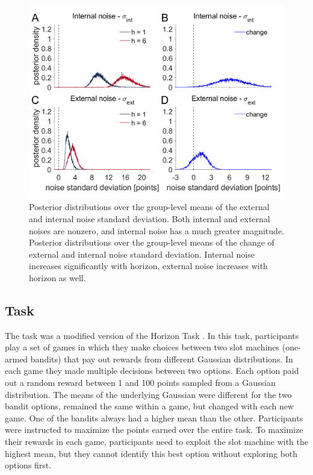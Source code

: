 \documentclass[12pt]{article}
\begin{document}
	\begin{figure}[H]
		\begin{center}
			\includegraphics[width=1\textwidth]{figall/hyperprior.png}
			\caption[Posterior distributions over the group-level noise standard deviation of the external and internal noise variance.]{Posterior distributions over the group-level means of the external and internal noise standard deviation. Both internal and external noises are nonzero, and internal noise has a much greater magnitude. Posterior distributions over the group-level means of the change of external and internal noise standard deviation. Internal noise increases significantly with horizon, external noise increases with horizon as well.}
			\label{fig:mb12}
		\end{center}
	\end{figure}
	
	\subsection*{Task}
	The task was a modified version of the Horizon Task \citep{wilson2014}. In this task, participants play a set of games in which they make choices between two slot machines (one-armed bandits) that pay out rewards from different Gaussian distributions. In each game they made multiple decisions between two options. Each option paid out a random reward between 1 and 100 points sampled from a Gaussian distribution. The means of the underlying Gaussian were different for the two bandit options, remained the same within a game, but changed with each new game. One of the bandits always had a higher mean than the other. Participants were instructed to maximize the points earned over the entire task. To maximize their rewards in each game, participants need to exploit the slot machine with the highest mean, but they cannot identify this best option without exploring both options first. 
	
\end{document}
